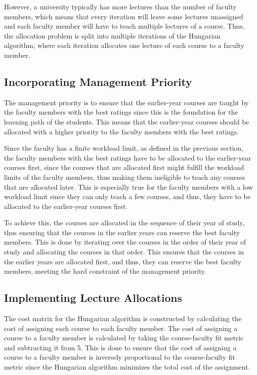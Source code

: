 However, a university typically has more lectures than the number of faculty members, which means that every iteration will leave some lectures unassigned and each faculty member will have to teach multiple lectures of a course. Thus, the allocation problem is split into multiple iterations of the Hungarian algorithm, where each iteration allocates one lecture of each course to a faculty member.

\subsection{Incorporating Management Priority}

The management priority is to ensure that the earlier-year courses are taught by the faculty members with the best ratings since this is the foundation for the learning path of the students. This means that the earlier-year courses should be allocated with a higher priority to the faculty members with the best ratings.

Since the faculty has a finite workload limit, as defined in the previous section, the faculty members with the best ratings have to be allocated to the earlier-year courses first, since the courses that are allocated first might fulfill the workload limits of the faculty members, thus making them ineligible to teach any courses that are allocated later. This is especially true for the faculty members with a low workload limit since they can only teach a few courses, and thus, they have to be allocated to the earlier-year courses first.

To achieve this, the courses are allocated in the sequence of their year of study, thus ensuring that the courses in the earlier years can reserve the best faculty members. This is done by iterating over the courses in the order of their year of study and allocating the courses in that order. This ensures that the courses in the earlier years are allocated first, and thus, they can reserve the best faculty members, meeting the hard constraint of the management priority.

\subsection{Implementing Lecture Allocations}

The cost matrix for the Hungarian algorithm is constructed by calculating the cost of assigning each course to each faculty member. The cost of assigning a course to a faculty member is calculated by taking the course-faculty fit metric and subtracting it from 5. This is done to ensure that the cost of assigning a course to a faculty member is inversely proportional to the course-faculty fit metric since the Hungarian algorithm minimizes the total cost of the assignment.

